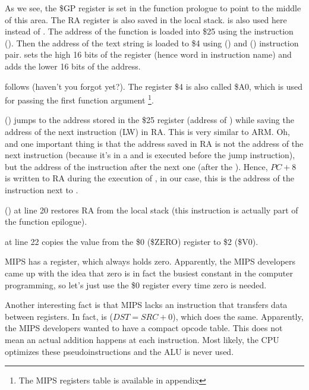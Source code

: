 As we see, the \$GP register is set in the function prologue to point to the middle of this area.
The \ac{RA} register is also saved in the local stack.
\puts is also used here instead of \printf.
The address of the \puts function is loaded into \$25 using  the instruction ().
Then the address of the text string is loaded to \$4 using  () and 
 () instruction pair.
 sets the high 16 bits of the register (hence  word in instruction name) and  adds
the lower 16 bits of the address.

 follows  (haven't you forgot  yet?).
The register \$4 is also called \$A0, which is used for passing the first function argument
\footnote{The MIPS registers table is available in appendix }.


 () jumps to the address stored in the \$25 register (address of \puts) 
while saving the address of the next instruction (LW) in \ac{RA}.
This is very similar to ARM.
Oh, and one important thing is that the address saved in \ac{RA} is not the address of the next instruction (because
it's in a  and is executed before the jump instruction),
but the address of the instruction after the next one (after the ).
Hence, $PC + 8$ is written to \ac{RA} during the execution of , in our case, this is the address of the 
instruction next to .

 () at line 20 restores \ac{RA} from the local stack (this instruction is actually part of the function epilogue).


 at line 22 copies the value from the \$0 (\$ZERO) register to \$2 (\$V0).
\label{MIPS_zero_register}

MIPS has a  register, which always holds zero.
Apparently, the MIPS developers came up with the idea that zero is in fact the busiest constant in the computer programming,
so let's just use the \$0 register every time zero is needed.

Another interesting fact is that MIPS lacks an instruction that transfers data between registers.
In fact,  is  ($DST=SRC+0$), which does the same.
Apparently, the MIPS developers wanted to have a compact opcode table.
This does not mean an actual addition happens at each  instruction.
Most likely, the \ac{CPU} optimizes these pseudoinstructions and the \ac{ALU} is never used.

